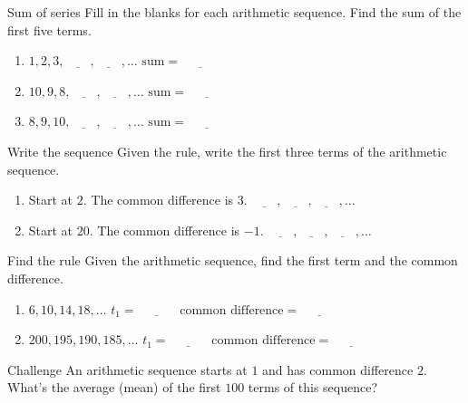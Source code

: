 \documentclass[12pt,letterpaper]{article}
\begin{document}
\begin{problem}{Sum of series}
 Fill in the blanks for each arithmetic sequence. Find the sum of the first five terms.

 \begin{enumerate}[\hspace{.5cm}a.]
  \item $1, 2, 3, \underline{\hspace{2em}}, \underline{\hspace{2em}}, \ldots$
  \hfill $\text{sum} = \underline{\hspace{3em}}$
  \item $10, 9, 8, \underline{\hspace{2em}}, \underline{\hspace{2em}}, \ldots$
  \hfill $\text{sum} = \underline{\hspace{3em}}$
  \item $8, 9, 10, \underline{\hspace{2em}}, \underline{\hspace{2em}}, \ldots$
  \hfill $\text{sum} = \underline{\hspace{3em}}$
 \end{enumerate}
\end{problem}

\begin{problem}{Write the sequence}
 Given the rule, write the first three terms of the arithmetic sequence.

 \begin{enumerate}[\hspace{.5cm}a.]
  \item Start at $2$. The common difference is $3$.
  \hfill $\underline{\hspace{2em}}, \underline{\hspace{2em}}, \underline{\hspace{2em}}, \ldots$
  \item Start at $20$. The common difference is $-1$.
  \hfill $\underline{\hspace{2em}}, \underline{\hspace{2em}}, \underline{\hspace{2em}}, \ldots$
 \end{enumerate}
\end{problem}

\begin{problem}{Find the rule}
 Given the arithmetic sequence, find the first term and the common difference.

 \begin{enumerate}[\hspace{.5cm}a.]
  \item $6, 10, 14, 18, \ldots$ \hfill $t_1 = \underline{\hspace{3em}}$
  $\text{common difference} = \underline{\hspace{3em}}$
  \item $200, 195, 190, 185, \ldots$ \hfill $t_1 = \underline{\hspace{3em}}$
  $\text{common difference} = \underline{\hspace{3em}}$
 \end{enumerate}
\end{problem}

\begin{problem}{Challenge}
 An arithmetic sequence starts at $1$ and has common difference $2$.
 What's the average (mean) of the first $100$ terms of this sequence?
\end{problem}
\end{document}
